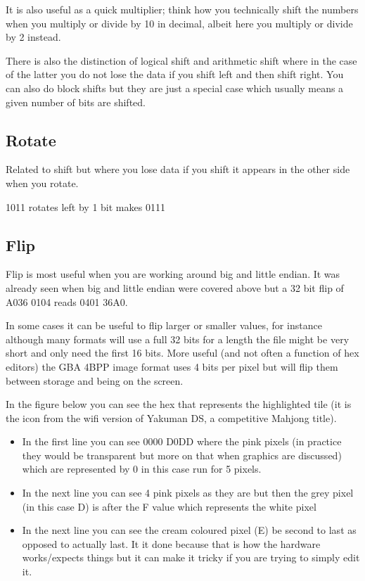 \documentclass[
]{book}
\providecommand{\tightlist}{%
  \setlength{\itemsep}{0pt}\setlength{\parskip}{0pt}}
\begin{document}
It is also useful as a quick multiplier; think how you technically shift the numbers when you multiply or divide by 10 in decimal, albeit here you multiply or divide by 2 instead.

There is also the distinction of logical shift and arithmetic shift where in the case of the latter you do not lose the data if you shift left and then shift right. You can also do block shifts but they are just a special case which usually means a given number of bits are shifted.

\hypertarget{rotate}{%
\subsection{Rotate}\label{rotate}}

Related to shift but where you lose data if you shift it appears in the other side when you rotate.

1011 rotates left by 1 bit makes 0111

\hypertarget{flip}{%
\subsection{Flip}\label{flip}}

Flip is most useful when you are working around big and little endian. It was already seen when big and little endian were covered above but a 32 bit flip of A036 0104 reads 0401 36A0.

In some cases it can be useful to flip larger or smaller values, for instance although many formats will use a full 32 bits for a length the file might be very short and only need the first 16 bits. More useful (and not often a function of hex editors) the GBA 4BPP image format uses 4 bits per pixel but will flip them between storage and being on the screen.

In the figure below you can see the hex that represents the highlighted tile (it is the icon from the wifi version of Yakuman DS, a competitive Mahjong title).

\begin{itemize}
\tightlist
\item
  In the first line you can see 0000 D0DD where the pink pixels (in practice they would be transparent but more on that when graphics are discussed) which are represented by 0 in this case run for 5 pixels.
\item
  In the next line you can see 4 pink pixels as they are but then the grey pixel (in this case D) is after the F value which represents the white pixel
\item
  In the next line you can see the cream coloured pixel (E) be second to last as opposed to actually last. It it done because that is how the hardware works/expects things but it can make it tricky if you are trying to simply edit it.
\end{itemize}
\end{document}
